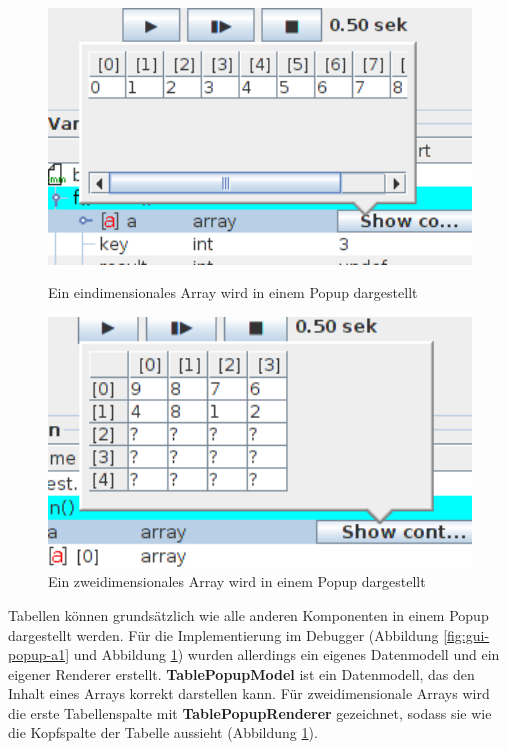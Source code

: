 \begin{figure}[h!]
\centering
	\begin{minipage}{0.45\textwidth}
		\centering
		\includegraphics[width=1.0\textwidth]{./media/images/gui/popup/array1dim.png}
		\caption{Ein eindimensionales Array wird in einem Popup dargestellt}
		\label{fig:gui-popup-a1}
	\end{minipage}\hfill
	\begin{minipage}{0.46\textwidth}
		\centering
		\includegraphics[width=1.0\textwidth]{./media/images/gui/popup/array2dim.png}
		\caption{Ein zweidimensionales Array wird in einem Popup dargestellt}
		\label{fig:gui-popup-a2}
	\end{minipage}
\end{figure}

Tabellen können grundsätzlich wie alle anderen Komponenten in einem Popup dargestellt werden. Für die Implementierung im Debugger (Abbildung \ref{fig:gui-popup-a1} und Abbildung \ref{fig:gui-popup-a2}) wurden allerdings ein eigenes Datenmodell und ein eigener Renderer erstellt. \textbf{TablePopupModel} ist ein Datenmodell, das den Inhalt eines Arrays korrekt darstellen kann. Für zweidimensionale Arrays wird die erste Tabellenspalte mit \textbf{TablePopupRenderer} gezeichnet, sodass sie wie die Kopfspalte der Tabelle aussieht (Abbildung \ref{fig:gui-popup-a2}).


